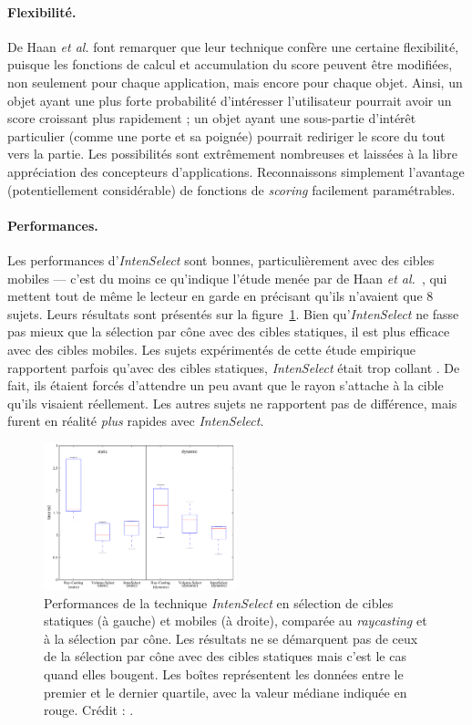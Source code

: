 	\paragraph{Flexibilité.}
	De Haan \emph{et al.} font remarquer que leur technique confère une certaine flexibilité, puisque les fonctions de calcul et accumulation du score peuvent être modifiées, non seulement pour chaque application, mais encore pour chaque objet. Ainsi, un objet ayant une plus forte probabilité d'intéresser l'utilisateur pourrait avoir un score croissant plus rapidement ; un objet ayant une sous-partie d'intérêt particulier (comme une porte et sa poignée) pourrait rediriger le score du tout vers la partie. Les possibilités sont extrêmement nombreuses et laissées à la libre appréciation des concepteurs d'applications. Reconnaissons simplement l'avantage (potentiellement considérable) de fonctions de \emph{scoring} facilement paramétrables.
	
	\paragraph{Performances.}
	Les performances d'\emph{IntenSelect} sont bonnes, particulièrement avec des cibles mobiles --- c'est du moins ce qu'indique l'étude menée par de Haan \emph{et al.}~\cite{de2005intenselect}, qui mettent tout de même le lecteur en garde en précisant qu'ils n'avaient que 8 sujets. Leurs résultats sont présentés sur la figure~\ref{fig:intensPerf}. Bien qu'\emph{IntenSelect} ne fasse pas mieux que la sélection par cône avec des cibles statiques, il est plus efficace avec des cibles mobiles. Les sujets expérimentés de cette étude empirique rapportent parfois qu'avec des cibles statiques, \emph{IntenSelect} était trop \og collant \fg{}. De fait, ils étaient forcés d'attendre un peu avant que le rayon s'attache à la cible qu'ils visaient réellement. Les autres sujets ne rapportent pas de différence, mais furent en réalité \emph{plus} rapides avec \emph{IntenSelect}.
	
	\begin{figure}
		\centering
		\includegraphics[width=0.5\textwidth]{figures/ch2/intensPerf}
		\caption[\emph{IntenSelect} -- performances]{Performances de la technique \emph{IntenSelect} en sélection de cibles statiques (à gauche) et mobiles (à droite), comparée au \emph{raycasting} et à la sélection par cône. Les résultats ne se démarquent pas de ceux de la sélection par cône avec des cibles statiques mais c'est le cas quand elles bougent. Les boîtes représentent les données entre le premier et le dernier quartile, avec la valeur médiane indiquée en rouge. Crédit : \cite{de2005intenselect}.}
		\label{fig:intensPerf}
	\end{figure}
	
